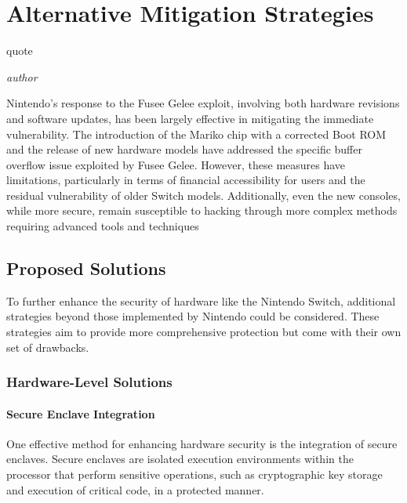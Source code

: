\chapter{Alternative Mitigation Strategies}
\epigraph{quote}{\textit{author}}

Nintendo's response to the Fusee Gelee exploit, involving both hardware revisions and software updates, has been largely effective in mitigating the immediate vulnerability. The introduction of the Mariko chip with a corrected Boot ROM and the release of new hardware models have addressed the specific buffer overflow issue exploited by Fusee Gelee. However, these measures have limitations, particularly in terms of financial accessibility for users and the residual vulnerability of older Switch models. Additionally, even the new consoles, while more secure, remain susceptible to hacking through more complex methods requiring advanced tools and techniques

\section{Proposed Solutions}
To further enhance the security of hardware like the Nintendo Switch, additional strategies beyond those implemented by Nintendo could be considered. These strategies aim to provide more comprehensive protection but come with their own set of drawbacks.

\subsection{Hardware-Level Solutions}
\subsubsection{Secure Enclave Integration}

One effective method for enhancing hardware security is the integration of secure enclaves. Secure enclaves are isolated execution environments within the processor that perform sensitive operations, such as cryptographic key storage and execution of critical code, in a protected manner.\cite{IntroductionHardwareSecurity}

